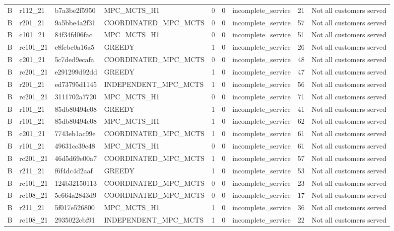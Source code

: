 \begin{table}
{\begin{tabular}{llllrrlrl}
B & r112\_21 & b7a3be2f5950 & MPC\_MCTS\_H1 & 0 & 0 & incomplete\_service & 21 & Not all customers served \\
B & r201\_21 & 9a5bbe4a2f31 & COORDINATED\_MPC\_MCTS & 0 & 0 & incomplete\_service & 57 & Not all customers served \\
B & c101\_21 & 84f34fd06fac & MPC\_MCTS\_H1 & 0 & 0 & incomplete\_service & 51 & Not all customers served \\
B & rc101\_21 & c8febc0a16a5 & GREEDY & 1 & 0 & incomplete\_service & 26 & Not all customers served \\
B & c201\_21 & 5c7ded9ecafa & COORDINATED\_MPC\_MCTS & 0 & 0 & incomplete\_service & 48 & Not all customers served \\
B & rc201\_21 & e291299d92dd & GREEDY & 1 & 0 & incomplete\_service & 47 & Not all customers served \\
B & r201\_21 & ed73795d1145 & INDEPENDENT\_MPC\_MCTS & 1 & 0 & incomplete\_service & 56 & Not all customers served \\
B & rc201\_21 & 3111702a7720 & MPC\_MCTS\_H1 & 0 & 0 & incomplete\_service & 71 & Not all customers served \\
B & r101\_21 & 85db80494c08 & GREEDY & 1 & 0 & incomplete\_service & 41 & Not all customers served \\
B & r101\_21 & 85db80494c08 & MPC\_MCTS\_H1 & 1 & 0 & incomplete\_service & 62 & Not all customers served \\
B & c201\_21 & 7743eb1ac99e & COORDINATED\_MPC\_MCTS & 1 & 0 & incomplete\_service & 61 & Not all customers served \\
B & r101\_21 & 49631cc39c48 & MPC\_MCTS\_H1 & 0 & 0 & incomplete\_service & 61 & Not all customers served \\
B & rc201\_21 & 46d5d69e00a7 & COORDINATED\_MPC\_MCTS & 1 & 0 & incomplete\_service & 57 & Not all customers served \\
B & r211\_21 & f6f4dc4d2aaf & GREEDY & 1 & 0 & incomplete\_service & 53 & Not all customers served \\
B & rc101\_21 & 124b32150113 & COORDINATED\_MPC\_MCTS & 0 & 0 & incomplete\_service & 23 & Not all customers served \\
B & rc108\_21 & 5e664a2843d9 & COORDINATED\_MPC\_MCTS & 0 & 0 & incomplete\_service & 17 & Not all customers served \\
B & r211\_21 & 5f017e526800 & MPC\_MCTS\_H1 & 1 & 0 & incomplete\_service & 36 & Not all customers served \\
B & rc108\_21 & 2935022cbf91 & INDEPENDENT\_MPC\_MCTS & 1 & 0 & incomplete\_service & 22 & Not all customers served \\

\end{tabular}}
\end{table}
